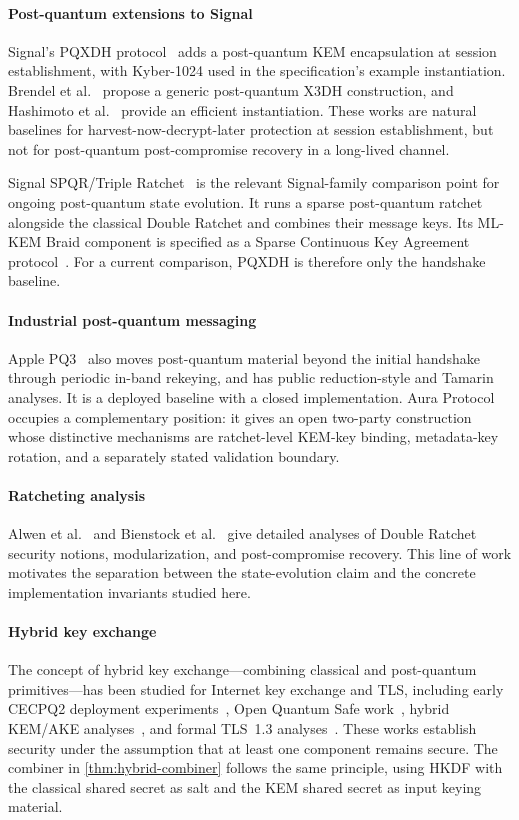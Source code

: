 \documentclass[preprint,12pt]{elsarticle}
\theoremstyle{definition}
\newcommand{\tech}[1]{\textnormal{#1}}
\newcommand{\SPQR}{\tech{SPQR}}
\newcommand{\PQThree}{\tech{PQ3}}
\begin{document}
\paragraph{Post-quantum extensions to Signal}
Signal's PQXDH protocol~\cite{signal-pqxdh} adds a post-quantum KEM encapsulation at session establishment, with Kyber-1024 used in the specification's example instantiation. Brendel et al.~\cite{brendel2020} propose a generic post-quantum X3DH construction, and Hashimoto et al.~\cite{hashimoto2021} provide an efficient instantiation. These works are natural baselines for harvest-now-decrypt-later protection at session establishment, but not for post-quantum post-compromise recovery in a long-lived channel.

Signal \SPQR{}/Triple Ratchet~\cite{signal-spqr,signal-double-ratchet} is the relevant Signal-family comparison point for ongoing post-quantum state evolution. It runs a sparse post-quantum ratchet alongside the classical Double Ratchet and combines their message keys. Its ML-KEM Braid component is specified as a Sparse Continuous Key Agreement protocol~\cite{mlkem-braid}. For a current comparison, PQXDH is therefore only the handshake baseline.

\paragraph{Industrial post-quantum messaging}
Apple \PQThree{}~\cite{apple-pq3,stebila-pq3,linker-pq3} also moves post-quantum material beyond the initial handshake through periodic in-band rekeying, and has public reduction-style and Tamarin analyses. It is a deployed baseline with a closed implementation. Aura Protocol occupies a complementary position: it gives an open two-party construction whose distinctive mechanisms are ratchet-level KEM-key binding, metadata-key rotation, and a separately stated validation boundary.

\paragraph{Ratcheting analysis}
Alwen et al.~\cite{alwen2020} and Bienstock et al.~\cite{bienstock2020} give detailed analyses of Double Ratchet security notions, modularization, and post-compromise recovery. This line of work motivates the separation between the state-evolution claim and the concrete implementation invariants studied here.

\paragraph{Hybrid key exchange}
The concept of hybrid key exchange---combining classical and post-quantum primitives---has been studied for Internet key exchange and TLS, including early CECPQ2 deployment experiments~\cite{cecpq2}, Open Quantum Safe work~\cite{stebila2020}, hybrid KEM/AKE analyses~\cite{bindel2019}, and formal TLS~1.3 analyses~\cite{dowling2020}. These works establish security under the assumption that at least one component remains secure. The combiner in \cref{thm:hybrid-combiner} follows the same principle, using HKDF with the classical shared secret as salt and the KEM shared secret as input keying material.
\end{document}

